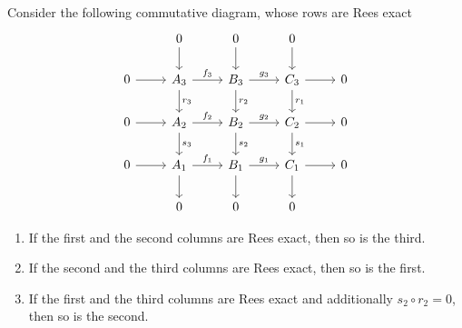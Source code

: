 \begin{corollary}[3x3 lemma]
    Consider the following commutative diagram, whose rows are Rees exact
    \[\begin{tikzcd}
        & 0 & 0 & 0 \\
        0 & {A_3} & {B_3} & {C_3} & 0 \\
        0 & {A_2} & {B_2} & {C_2} & 0 \\
        0 & {A_1} & {B_1} & {C_1} & 0 \\
        & 0 & 0 & 0
        \arrow[from=1-2, to=2-2]
        \arrow[from=1-3, to=2-3]
        \arrow[from=1-4, to=2-4]
        \arrow[from=2-1, to=2-2]
        \arrow["{f_3}", from=2-2, to=2-3]
        \arrow["{r_3}", from=2-2, to=3-2]
        \arrow["{g_3}", from=2-3, to=2-4]
        \arrow["{r_2}", from=2-3, to=3-3]
        \arrow[from=2-4, to=2-5]
        \arrow["{r_1}", from=2-4, to=3-4]
        \arrow[from=3-1, to=3-2]
        \arrow["{f_2}", from=3-2, to=3-3]
        \arrow["{s_3}", from=3-2, to=4-2]
        \arrow["{g_2}", from=3-3, to=3-4]
        \arrow["{s_2}", from=3-3, to=4-3]
        \arrow[from=3-4, to=3-5]
        \arrow["{s_1}", from=3-4, to=4-4]
        \arrow[from=4-1, to=4-2]
        \arrow["{f_1}", from=4-2, to=4-3]
        \arrow[from=4-2, to=5-2]
        \arrow["{g_1}", from=4-3, to=4-4]
        \arrow[from=4-3, to=5-3]
        \arrow[from=4-4, to=4-5]
        \arrow[from=4-4, to=5-4]
    \end{tikzcd}\]
    \begin{enumerate}
        \item If the first and the second columns are Rees exact, then so is the third.
        \item If the second and the third columns are Rees exact, then so is the first.
        \item If the first and the third columns are Rees exact and additionally $s_2\circ r_2=0$, then so is the second.
    \end{enumerate}
\end{corollary}
